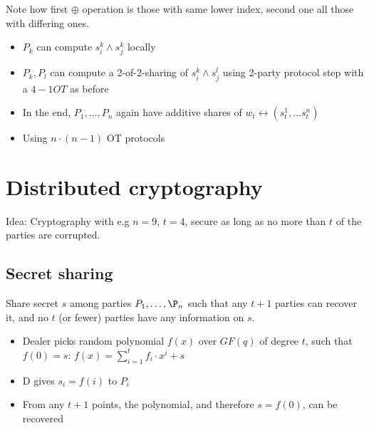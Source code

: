 Note how first $\oplus$ operation is those with same lower index, second one
all those with differing ones.

\begin{itemize}
		\item $P_k$ can compute $s^k_i \land s^k_j$ locally
		\item $P_k, P_l$ can compute a 2-of-2-sharing of $s^k_i \land s^l_j$
				using 2-party protocol step with a $4-1 OT$ as before
		\item In the end, $P_1, \ldots, P_n$ again have additive shares of $w_t \leftrightarrow (s^1_t, \ldots s^n_t)$
		\item Using $n \cdot (n - 1)$ OT protocols
\end{itemize}

\section{Distributed cryptography}

Idea: Cryptography with e.g $n = 9$, $t = 4$, secure as long as no more than
$t$ of the parties are corrupted.

\subsection{Secret sharing}

Share secret $s$ among parties $P_1, \ldots, \P_n$ such that any $t+1$ parties
can recover it, and no $t$ (or fewer) parties have any information on $s$.

\begin{itemize}
		\item Dealer picks random polynomial $f(x)$ over $GF(q)$ of degree $t$,
				such that $f(0) = s$: $f(x) = \sum_{i=1}^t f_i \cdot x^i + s$
		\item D gives $s_i = f(i)$ to $P_i$
		\item From any $t+1$ points, the polynomial, and therefore $s = f(0)$, can be recovered
\end{itemize}

